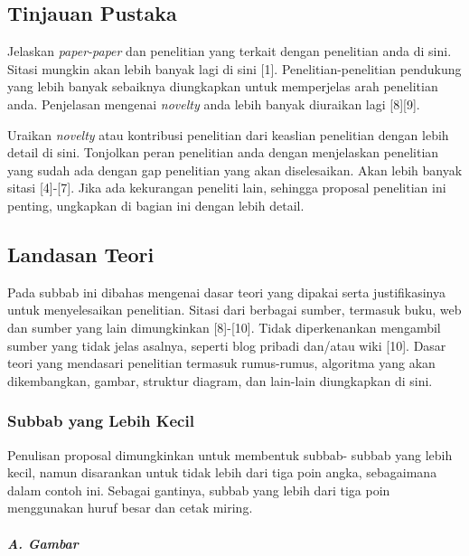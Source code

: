 \documentclass[12pt]{article}
\begin{document}
\subsection{Tinjauan Pustaka}
Jelaskan \textit{paper-paper} dan penelitian yang terkait  dengan penelitian anda di sini. Sitasi mungkin akan lebih banyak lagi di sini [1]. Penelitian-penelitian pendukung yang lebih banyak sebaiknya diungkapkan untuk memperjelas arah penelitian anda.  Penjelasan mengenai \textit{novelty} anda lebih banyak diuraikan lagi [8][9].
 
Uraikan  \textit{novelty} atau kontribusi penelitian dari keaslian penelitian dengan lebih detail di sini. Tonjolkan peran penelitian anda dengan menjelaskan penelitian yang sudah ada dengan gap penelitian yang akan diselesaikan. Akan lebih banyak sitasi [4]-[7]. Jika ada kekurangan peneliti lain, sehingga proposal penelitian ini penting, ungkapkan di bagian ini dengan lebih detail. 


\subsection{Landasan Teori}
Pada subbab ini dibahas mengenai dasar teori yang dipakai serta justifikasinya untuk menyelesaikan penelitian. Sitasi dari berbagai sumber, termasuk buku, web dan sumber yang lain dimungkinkan [8]-[10]. Tidak diperkenankan mengambil sumber yang tidak jelas asalnya, seperti blog pribadi dan/atau wiki [10]. Dasar teori yang mendasari penelitian termasuk rumus-rumus, algoritma yang akan dikembangkan, gambar, struktur diagram, dan lain-lain diungkapkan di sini. 

\subsubsection{Subbab yang Lebih Kecil}

Penulisan proposal dimungkinkan untuk membentuk subbab- subbab yang lebih kecil, namun disarankan untuk tidak lebih dari tiga poin angka, sebagaimana dalam contoh ini. Sebagai gantinya, subbab yang lebih dari tiga poin menggunakan huruf besar dan cetak miring.

\paragraph{\textit{A. Gambar}}\mbox{}
\end{document}
